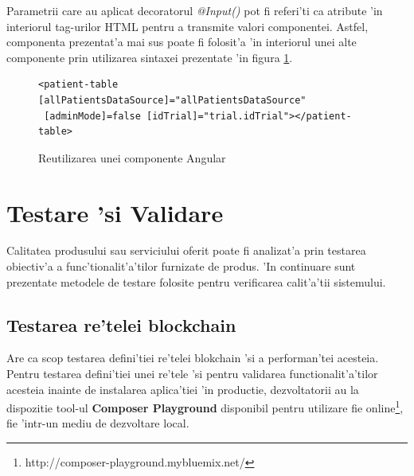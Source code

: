 \documentclass[12pt,a4paper,twoside]{report}
\begin{document}
Parametrii care au aplicat decoratorul \emph{@Input()} pot fi referi'ti ca atribute 'in interiorul tag-urilor HTML pentru a transmite valori componentei. Astfel, componenta prezentat'a mai sus poate fi folosit'a 'in interiorul unei alte componente prin utilizarea sintaxei prezentate 'in figura \ref{reuse}.
  	\begin{figure}[H]
  	\begin{lstlisting}[style=htmlcssjs]
 <patient-table [allPatientsDataSource]="allPatientsDataSource"
 [adminMode]=false [idTrial]="trial.idTrial"></patient-table>
  	\end{lstlisting}
  	\caption{Reutilizarea unei componente Angular}
  	\label{reuse}
  	\end{figure}
  	


\newpage
\thispagestyle{empty}
\mbox{}

\chapter{Testare 'si Validare}

    Calitatea produsului sau serviciului oferit poate fi analizat'a prin testarea obiectiv'a a func'tionalit'a'tilor furnizate de produs. 'In continuare sunt prezentate metodele de testare folosite pentru verificarea calit'a'tii sistemului.
    
    \section{Testarea re'telei blockchain}
    Are ca scop testarea defini'tiei re'telei blokchain 'si a performan'tei acesteia. Pentru testarea defini'tiei unei re'tele 'si pentru validarea functionalit'a'tilor acesteia inainte de instalarea aplica'tiei 'in productie, dezvoltatorii au la dispozitie tool-ul \textbf{Composer Playground} disponibil pentru utilizare fie online\footnote{http://composer-playground.mybluemix.net/}, fie 'intr-un mediu de dezvoltare local.
    
\end{document}
